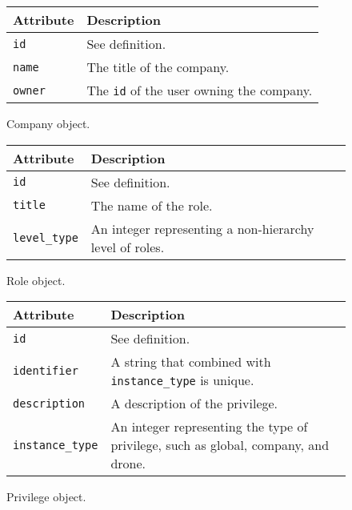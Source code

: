 \begin{figure}[htb]
\begin{center}
\begin{tabular}{ | l | p{8cm} | }
  \hline
    \textbf{Attribute} & \textbf{Description} \\ \hline
    \verb+id+ & See definition. \\ \hline
    \verb+name+ & The title of the company.\\ \hline
    \verb+owner+ & The \verb+id+ of the user owning the company.\\ \hline
\end{tabular}
\caption{Company object.}
\label{tab:company_object}
\end{center}
\end{figure}

\begin{figure}[htb]
\begin{center}
\begin{tabular}{ | l | p{8cm} | }
  \hline
    \textbf{Attribute} & \textbf{Description} \\ \hline
    \verb+id+ & See definition.\\ \hline
    \verb+title+ & The name of the role.\\ \hline
    \verb+level_type+ & An integer representing a non-hierarchy level of roles.\\ \hline
\end{tabular}
\caption{Role object.}
\label{tab:role_object}
\end{center}
\end{figure}

\begin{figure}[htb]
\begin{center}
\begin{tabular}{ | l | p{8cm} | }
  \hline
    \textbf{Attribute} & \textbf{Description} \\ \hline
    \verb+id+ & See definition.\\ \hline
    \verb+identifier+ & A string that combined with \verb+instance_type+ is unique.\\ \hline
    \verb+description+ & A description of the privilege.\\ \hline
    \verb+instance_type+ & An integer representing the type of privilege, such as global, company, and drone.\\ \hline
\end{tabular}
\caption{Privilege object.}
\label{tab:privilege_object}
\end{center}
\end{figure}

